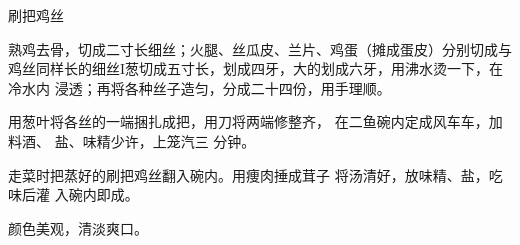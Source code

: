 \begin{recipe}{刷把鸡丝}

\ingredients


\preparation

\step 熟鸡去骨，切成二寸长细丝；火腿、丝瓜皮、兰片、鸡蛋（摊成蛋皮）分别切成与
鸡丝同样长的细丝I葱切成五寸长，划成四牙，大的划成六牙，用沸水烫一下，在冷水内
浸透；再将各种丝子造匀，分成二十四份，用手理顺。

用葱叶将各丝的一端捆扎成把，用刀将两端修整齐， 在二鱼碗内定成风车车，加料酒、
盐、味精少许，上笼汽三 分钟。

走菜时把蒸好的刷把鸡丝翻入碗内。用痩肉捶成茸子 将汤清好，放味精、盐，吃味后灌
入碗内即成。

\features

颜色美观，清淡爽口。

\end{recipe}

